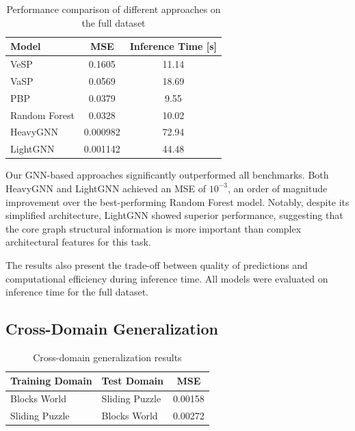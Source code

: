 \documentclass[letterpaper]{article}
\newcommand{\gur}[1]{{\color{teal}{Gur: #1}}}
\newcommand{\naomi}[1]{{\color{magenta}{Naomi: #1}}}
\begin{document}
\begin{table}[t]
    \centering
    \caption{Performance comparison of different approaches on the full dataset}
    \label{tab:performance}
    \begin{tabular}{|l|c|c|}
    \hline
    \textbf{Model} & \textbf{MSE} & \textbf{Inference Time [s]}\\
    \hline
    VeSP & 0.1605 & 11.14 \\
    VaSP & 0.0569 & 18.69 \\
    PBP & 0.0379 & 9.55 \\
    Random Forest & 0.0328 & 10.02 \\
    HeavyGNN & 0.000982 & 72.94 \\
    LightGNN & 0.001142 & 44.48 \\
    \hline
    \end{tabular}
\end{table}

Our GNN-based approaches significantly outperformed all benchmarks. Both HeavyGNN and LightGNN achieved an MSE of $10^{-3}$, an order of magnitude improvement over the best-performing Random Forest model. Notably, despite its simplified architecture, LightGNN showed superior performance, suggesting that the core graph structural information is more important than complex architectural features for this task. \gur{revise}

The results also present the trade-off between quality of predictions and computational efficiency during inference time. All models were evaluated on inference time for the full dataset. \naomi{expand...}


\subsection{Cross-Domain Generalization}

\begin{table}
    \centering
    \caption{Cross-domain generalization results}
    \label{tab:cross_domain}
    \begin{tabular}{|l|l|c|}
    \hline
    \textbf{Training Domain} & \textbf{Test Domain} & \textbf{MSE} \\
    \hline
    Blocks World & Sliding Puzzle & 0.00158 \\
    Sliding Puzzle & Blocks World & 0.00272 \\
    \hline
    \end{tabular}
\end{table}
\end{document}
